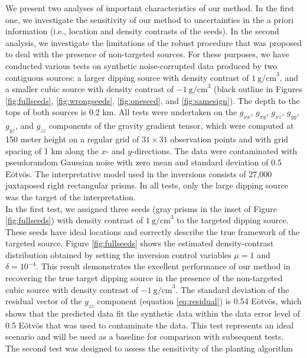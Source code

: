 We present two analyses of important characteristics of our method.
In the first one, we investigate the sensitivity of our method to
uncertainties in the a priori information
(i.e., location and density contrasts of the seeds).
In the second analysis, we investigate the limitations of the robust procedure
that was
proposed to deal with the presence of non-targeted sources.
For these purposes, we have conducted various tests on synthetic noise-corrupted
data produced by two contiguous sources: a larger dipping source with density
contrast of $1\ \mathrm{g/cm}^3$, and a smaller cubic source with density
contrast of $-1\ \mathrm{g/cm}^3$
(black outline in Figures \ref{fig:fullseeds},
\ref{fig:wrongseeds},
\ref{fig:oneseed}, and
\ref{fig:samesign}).
The depth to the tops of both sources is 0.2 km.
All tests were undertaken on the $g_{xx}$, $g_{xy}$, $g_{xz}$, $g_{yy}$,
$g_{yz}$, and $g_{zz}$ components of the gravity gradient tensor,
which were computed at 150 meter height on a
regular grid of $31 \times 31$ observation points and with grid spacing of
1 km along the $x$- and $y$-directions.
The data were contaminated with pseudorandom Gaussian noise with zero mean and
standard deviation of 0.5 E\"otv\"os.
The interpretative model used in the inversions consists of 27,000 juxtaposed
right rectangular prisms.
In all tests, only the large dipping source was the target of the
interpretation.
\\ \indent
In the first test, we assigned three seeds
(gray prisms in the inset of Figure \ref{fig:fullseeds})
with density contrast of $1\ \mathrm{g/cm}^3$ to the targeted dipping source.
These seeds have ideal locations and correctly describe the true framework of
the targeted source.
Figure \ref{fig:fullseeds} shows
the estimated density-contrast distribution
obtained by setting the inversion control variables
$\mu = 1$ and $\delta = 10^{-4}$.
This result demonstrates the excellent performance of our method in recovering
the true target dipping source in the presence of the non-targeted cubic source
with density contrast of $-1\ \mathrm{g/cm}^3$.
The standard deviation of the residual vector of the $g_{zz}$ component
(equation \ref{eq:residual})
is 0.54 E\"otv\"os,
which shows that the predicted data fit the synthetic data
within the data error level of 0.5 E\"otv\"os
that was used to contaminate the data.
This test represents an ideal scenario and
will be used as a baseline
for comparison with subsequent tests.
\\ \indent
The second test was designed to assess the sensitivity of the planting algorithm
